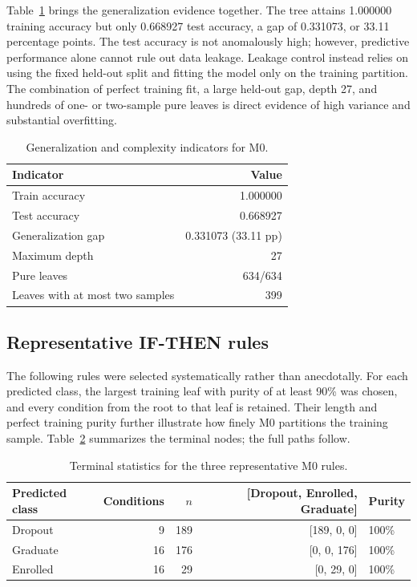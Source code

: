 Table~\ref{tab:e-overfit} brings the generalization evidence together. The
tree attains 1.000000 training accuracy but only 0.668927 test accuracy, a gap
of 0.331073, or 33.11 percentage points. The test accuracy is not anomalously
high; however, predictive performance alone cannot rule out data leakage.
Leakage control instead relies on using the fixed held-out split and fitting
the model only on the training partition. The combination of perfect training
fit, a large held-out gap, depth 27, and hundreds of one- or two-sample pure
leaves is direct evidence of high variance and substantial overfitting.

\begin{table}[H]
  \centering
  \caption{Generalization and complexity indicators for M0.}
  \label{tab:e-overfit}
  \begin{tabular}{@{}lr@{}}
    \toprule
    Indicator & Value \\
    \midrule
    Train accuracy & 1.000000 \\
    Test accuracy & 0.668927 \\
    Generalization gap & 0.331073 (33.11 pp) \\
    Maximum depth & 27 \\
    Pure leaves & 634/634 \\
    Leaves with at most two samples & 399 \\
    \bottomrule
  \end{tabular}
\end{table}

\subsection{Representative IF-THEN rules}

The following rules were selected systematically rather than anecdotally. For
each predicted class, the largest training leaf with purity of at least 90\%
was chosen, and every condition from the root to that leaf is retained. Their
length and perfect training purity further illustrate how finely M0 partitions
the training sample. Table~\ref{tab:e-rules} summarizes the terminal nodes;
the full paths follow.

\begin{table}[H]
  \centering
  \caption{Terminal statistics for the three representative M0 rules.}
  \label{tab:e-rules}
  \begin{tabular}{@{}lrrrl@{}}
    \toprule
    Predicted class & Conditions & $n$ & [Dropout, Enrolled, Graduate] & Purity \\
    \midrule
    Dropout & 9 & 189 & [189, 0, 0] & 100\% \\
    Graduate & 16 & 176 & [0, 0, 176] & 100\% \\
    Enrolled & 16 & 29 & [0, 29, 0] & 100\% \\
    \bottomrule
  \end{tabular}
\end{table}

